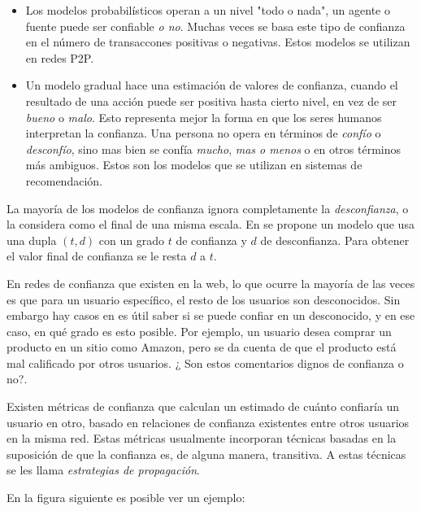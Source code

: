 \begin{itemize}
\item{Los modelos probabilísticos operan a un nivel "todo o nada", un agente o fuente puede ser confiable \textit{o no}. Muchas veces se basa este tipo de confianza en el número de transaccones positivas o negativas. Estos modelos se utilizan en redes P2P.}
\item{Un modelo gradual hace una estimación de valores de confianza, cuando el resultado de una acción puede ser positiva hasta cierto nivel, en vez de ser \textit{bueno} o \textit{malo}. Esto representa mejor la forma en que los seres humanos interpretan la confianza. Una persona no opera en términos de \textit{confío} o \textit{desconfío}, sino mas bien se confía \textit{mucho},  \textit{mas o menos} o en otros términos más ambiguos. Estos son los modelos que se utilizan en sistemas de recomendación.}
\end{itemize}

La mayoría de los modelos de confianza ignora completamente la \textit{desconfianza}, o la considera como el final de una misma escala. En \cite{Victor} se propone un modelo que usa una dupla $(t,d)$ con un grado $t$ de confianza y $d$ de desconfianza. Para obtener el valor final de confianza se le resta $d$ a $t$. 

En redes de confianza que existen en la web, lo que ocurre la mayoría de las veces es que para un usuario específico, el resto de los usuarios son desconocidos. Sin embargo hay casos en es útil saber si se puede confiar en un desconocido, y en ese caso, en qué grado es esto posible. Por ejemplo, un usuario desea comprar un producto en un sitio como Amazon, pero se da cuenta de que el producto está mal calificado por otros usuarios. ¿ Son estos comentarios dignos de confianza o no?. 

Existen métricas de confianza \cite{Victor} que calculan un estimado de cuánto confiaría un usuario en otro, basado en relaciones de confianza existentes entre otros usuarios en la misma red. Estas métricas usualmente incorporan técnicas basadas en la suposición de que la confianza es, de alguna manera, transitiva. A estas técnicas se les llama \textit{estrategias de propagación}.

En la figura siguiente es posible ver un ejemplo:

